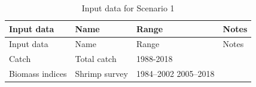 \documentclass[
]{article}
\begin{document}
\begin{longtable}[]{@{}llll@{}}
\caption{Input data for Scenario 1}\tabularnewline
\toprule
\begin{minipage}[b]{0.21\columnwidth}\raggedright
Input data\strut
\end{minipage} & \begin{minipage}[b]{0.20\columnwidth}\raggedright
Name\strut
\end{minipage} & \begin{minipage}[b]{0.15\columnwidth}\raggedright
Range\strut
\end{minipage} & \begin{minipage}[b]{0.33\columnwidth}\raggedright
Notes\strut
\end{minipage}\tabularnewline
\midrule
\endfirsthead
\toprule
\begin{minipage}[b]{0.21\columnwidth}\raggedright
Input data\strut
\end{minipage} & \begin{minipage}[b]{0.20\columnwidth}\raggedright
Name\strut
\end{minipage} & \begin{minipage}[b]{0.15\columnwidth}\raggedright
Range\strut
\end{minipage} & \begin{minipage}[b]{0.33\columnwidth}\raggedright
Notes\strut
\end{minipage}\tabularnewline
\midrule
\endhead
\begin{minipage}[t]{0.21\columnwidth}\raggedright
Catch\strut
\end{minipage} & \begin{minipage}[t]{0.20\columnwidth}\raggedright
Total catch\strut
\end{minipage} & \begin{minipage}[t]{0.15\columnwidth}\raggedright
1988-2018\strut
\end{minipage} & \begin{minipage}[t]{0.33\columnwidth}\raggedright
\strut
\end{minipage}\tabularnewline
\begin{minipage}[t]{0.21\columnwidth}\raggedright
Biomass indices\strut
\end{minipage} & \begin{minipage}[t]{0.20\columnwidth}\raggedright
Shrimp survey\strut
\end{minipage} & \begin{minipage}[t]{0.15\columnwidth}\raggedright
1984--2002 2005--2018\strut
\end{minipage} & \begin{minipage}[t]{0.33\columnwidth}\raggedright

\end{minipage}
\end{longtable}
\end{document}
